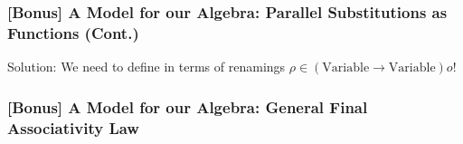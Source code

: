 \documentclass[dvipsnames,aspectratio=169,pdftex]{beamer}
\begin{document}
\begin{frame}[fragile]
  \frametitle{[Bonus] A Model for our Algebra: Parallel Substitutions as Functions (Cont.)}
  Solution: We need to define  in terms of renamings $\rho \in (\text{Variable} \to \text{Variable})o$!
  \noindent\begin{minipage}[t]{0.48\linewidth}
    \raggedright{}
    \EYRLookUp{}
    \EYRId{}
    \EYRExt{}
    \EYRWk{}
  \end{minipage}
  \hfill
  \begin{minipage}[t]{0.48\linewidth}
    \raggedright{}
    \EYSCompR{}
    \EYSLift{}
    \EYSTrav{}
  \end{minipage}
\end{frame}

\begin{frame}[fragile]
  \frametitle{[Bonus] A Model for our Algebra: General Final Associativity Law}
  \AAssocTryT{}
\end{frame}
\end{document}
